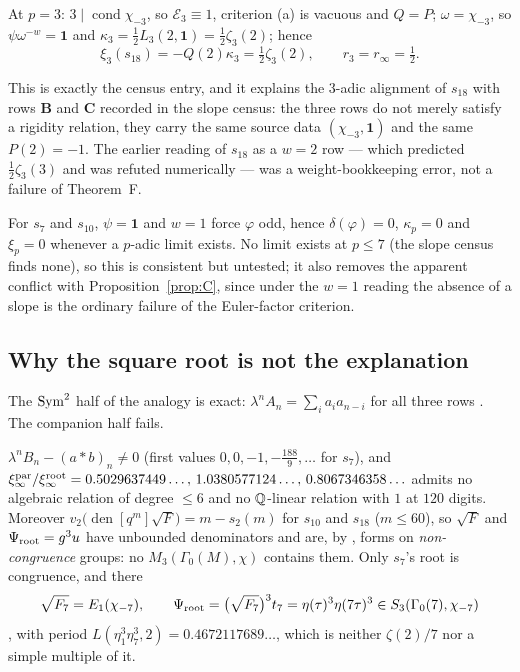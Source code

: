 \begin{corollary}\label{cor:s18padic}
At $p=3$: $3\mid\operatorname{cond}\chi_{-3}$, so $\mathcal E_3\equiv1$, criterion
\textup{(a)} is vacuous and $Q=P$; $\omega=\chi_{-3}$, so
$\psi\omega^{-w}=\mathbf 1$ and $\kappa_3=\tfrac12L_3(2,\mathbf 1)=\tfrac12\zeta_3(2)$;
hence
\[
\xi_3(s_{18})=-Q(2)\kappa_3=\tfrac12\zeta_3(2),
\qquad r_3=r_\infty=\tfrac12 .
\]
\end{corollary}

This is exactly the census entry, and it explains the $3$-adic alignment of
$s_{18}$ with rows $\mathbf B$ and $\mathbf C$ recorded in the slope census: the
three rows do not merely satisfy a rigidity relation, they carry the same source
data $(\chi_{-3},\mathbf 1)$ and the same $P(2)=-1$.  The earlier reading of
$s_{18}$ as a $w=2$ row --- which predicted $\tfrac12\zeta_3(3)$ and was refuted
numerically --- was a weight-bookkeeping error, not a failure of Theorem~F.

For $s_7$ and $s_{10}$, $\psi=\mathbf 1$ and $w=1$ force $\varphi$ odd, hence
$\delta(\varphi)=0$, $\kappa_p=0$ and $\xi_p=0$ whenever a $p$-adic limit exists.
No limit exists at $p\le7$ (the slope census finds none), so this is consistent
but untested; it also removes the apparent conflict with
Proposition~\ref{prop:C}, since under the $w=1$ reading the absence of a slope is
the ordinary failure of the Euler-factor criterion.

\subsection{Why the square root is not the explanation}\label{ss:wd-notroot}

The $\operatorname{Sym}^2$ half of the analogy is exact: $\lambda^nA_n=\sum_ia_ia_{n-i}$ for all
three rows .  The companion half fails.

\begin{verification}\label{ver:wdroot}
$\lambda^nB_n-(a*b)_n\neq0$ (first values $0,0,-1,-\tfrac{188}9,\dots$ for $s_7$),
and
$\xi_\infty^{\rm par}/\xi_\infty^{\rm root}
=0.5029637449\ldots,\,1.0380577124\ldots,\,0.8067346358\ldots$
admits no algebraic relation of degree $\le6$ and no $\mathbb{Q}$-linear relation with $1$
at $120$ digits.  Moreover
$v_2\bigl(\operatorname{den}[q^m]\sqrt F\bigr)=m-s_2(m)$ for $s_{10}$ and $s_{18}$
($m\le60$), so $\sqrt F$ and $\Psi_{\rm root}=g^3u$ have unbounded denominators
and are, by \cite{CDT2024}, forms on \emph{non-congruence} groups: no
$M_3(\Gamma_0(M),\chi)$ contains them.  Only $s_7$'s root is congruence, and there
\[
\sqrt{F_7}=E_1(\chi_{-7}),\qquad \Psi_{\rm root}=\bigl(\sqrt{F_7}\bigr)^3t_7
=\eta(\tau)^3\eta(7\tau)^3\in S_3(\Gamma_0(7),\chi_{-7})
\]
, with period $L(\eta_1^3\eta_7^3,2)=0.4672117689\ldots$,
which is neither $\zeta(2)/7$ nor a simple multiple of it.
\end{verification}

